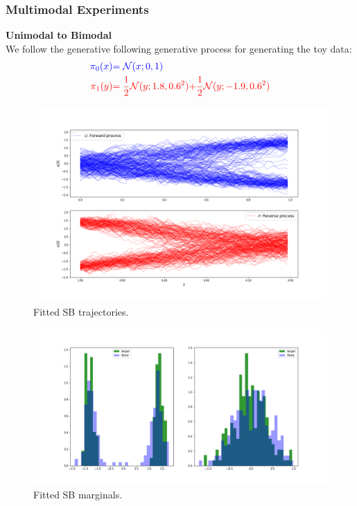 \documentclass[a4paper,12pt,twoside,openright]{report}
\theoremstyle{definition}
\begin{document}
\subsubsection{Multimodal Experiments}
\textbf{Unimodal to Bimodal}\\

We follow the generative following generative process for generating the toy data:
\begin{align*}
     \color{blue}{\pi_0(x)} &\color{blue}{= {\mathcal{N}}(x; 0,  1)} \\
    \color{red}{\pi_1(y)} &\color{red}{= \frac{1}{2}{\mathcal{N}}(y; 1.8, 0.6 ^2)}\color{red}{ + \frac{1}{2}{\mathcal{N}}(y; -1.9, 0.6 ^2) }
\end{align*}
\begin{figure}
    \centering
    \includegraphics[scale=0.5,trim={4.3cm 1cm 2.5cm 0}, clip]{images/GP/gp_final_bimodal_trajectories.png}
    \caption{ Fitted SB trajectories.  }
    \label{fig:bimodfinal200trajectroies}
\end{figure}
\begin{figure}
    \centering
    \includegraphics[scale=0.3,trim={4.3cm 1cm 2.5cm 0}, clip]{images/GP/gp_2_mode_final_boundaires.png}
    \caption{ Fitted SB marginals.  }
    \label{fig:bimodfinal200boundaries}
\end{figure}
\end{document}

